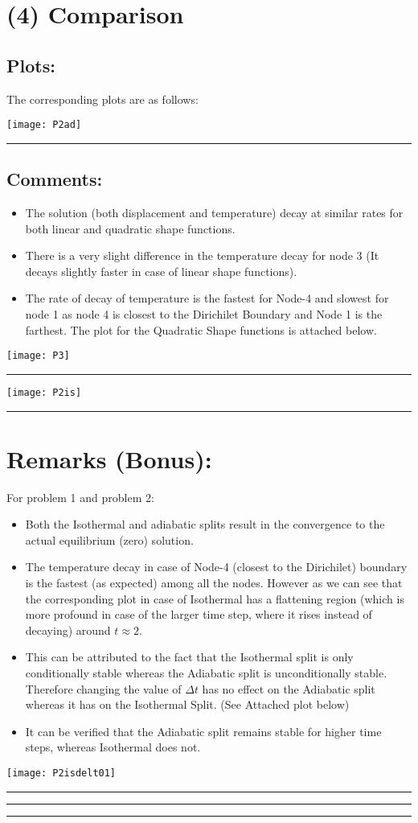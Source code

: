 \section*{(4) Comparison }
\subsection*{Plots: }
The corresponding plots are as follows: 
\begin{center}
\texttt{[image: P2ad]}
\end{center}\hrule
\subsection*{Comments: }
\begin{itemize}
\item The solution (both displacement and temperature) decay at similar rates for both linear and quadratic shape functions. 
\item There is a very slight difference in the temperature decay for node 3 (It decays slightly faster in case of linear shape functions). 
\item The rate of decay of temperature is the fastest for Node-4 and slowest for node 1 as node 4 is closest to the Dirichilet Boundary and Node 1 is the farthest. The plot for the Quadratic Shape functions is attached below. 
\end{itemize}
\begin{center}
\texttt{[image: P3]}
\end{center}\hrule
\begin{center}
\texttt{[image: P2is]}
\end{center}\hrule
\section*{Remarks (Bonus): }
For problem 1 and problem 2: 
\begin{itemize}
\item Both the Isothermal and adiabatic splits result in the convergence to the actual equilibrium (zero) solution. 
\item The temperature decay in case of Node-4 (closest to the Dirichilet) boundary is the fastest (as expected) among all the nodes. However as we can see that the corresponding plot in case of Isothermal has a flattening region (which is more profound in case of the larger time step, where it rises instead of decaying) around $t\approx2$. 
\item This can be attributed to the fact that the Isothermal split is only conditionally stable whereas the Adiabatic split is unconditionally stable. Therefore changing the value of $\Delta t$ has no effect on the Adiabatic split whereas it has on the Isothermal Split. (See Attached plot below)
\item It can be verified that the Adiabatic split remains stable for higher time steps, whereas Isothermal does not. 
\end{itemize}
\begin{center}
\texttt{[image: P2isdelt01]}
\end{center}\hrule\hrule\hrule
